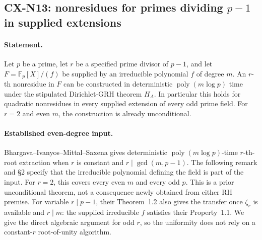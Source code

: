 \documentclass[11pt,a4paper]{article}
\begin{document}

\subsection{CX-N13: nonresidues for primes dividing \texorpdfstring{$p-1$}{p-1} in supplied extensions}
\label{cx:n13}

\paragraph{Statement.}
Let $p$ be a prime, let $r$ be a specified prime divisor of $p-1$, and let
$F=\mathbb F_p[X]/(f)$ be supplied by an irreducible polynomial $f$
of degree $m$. An $r$-th nonresidue in $F$ can be constructed in
deterministic $\operatorname{poly}(m\log p)$ time under the stipulated
Dirichlet-GRH theorem $H_A$. In particular this holds for quadratic
nonresidues in every supplied extension of every odd prime field.
For $r=2$ and even $m$, the construction is already unconditional.

\paragraph{Established even-degree input.}
Bhargava--Ivanyos--Mittal--Saxena \cite[Corollary~1.3, PDF p.~2]{BIMS17}
gives deterministic $\operatorname{poly}(m\log p)$-time $r$-th-root
extraction when $r$ is constant and $r\mid\gcd(m,p-1)$.
The following remark and \S2 specify that the irreducible polynomial
defining the field is part of the input. For $r=2$, this covers every
even $m$ and every odd $p$. This is a prior unconditional theorem,
not a consequence newly obtained from either RH premise.
For variable $r\mid p-1$, their Theorem~1.2 also gives the transfer
once $\zeta_r$ is available and $r\mid m$: the supplied irreducible
$f$ satisfies their Property~1.1. We give the direct algebraic
argument for odd $r$, so the uniformity does not rely on a
constant-$r$ root-of-unity algorithm.
\end{document}
